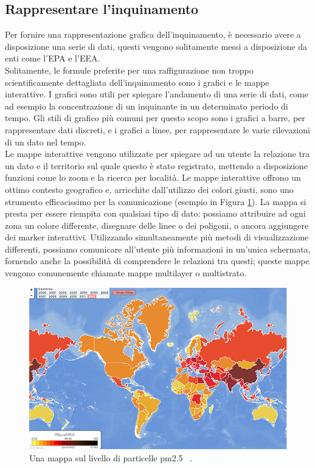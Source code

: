 \subsection{Rappresentare l'inquinamento}
Per fornire una rappresentazione grafica dell’inquinamento, è necessario avere a disposizione una serie di dati, questi vengono solitamente messi a disposizione da enti come l'EPA e l'EEA.
\\ 
Solitamente, le formule preferite per una raffigurazione non troppo scientificamente dettagliata dell’inquinamento sono i grafici e le mappe interattive.
I grafici sono utili per spiegare l'andamento di una serie di dati, come ad esempio la concentrazione di un inquinante in un determinato periodo di tempo.
Gli stili di grafico più comuni per questo scopo sono i grafici a barre, per rappresentare dati discreti, e i grafici a linee, per rappresentare le varie rilevazioni di un dato nel tempo.
\\ 
Le mappe interattive vengono utilizzate per spiegare ad un utente la relazione tra un dato e il territorio sul quale questo è stato registrato, mettendo a disposizione funzioni come lo zoom e la ricerca per località.
Le mappe interattive offrono un ottimo contesto geografico e, arricchite dall'utilizzo dei colori giusti, sono uno strumento efficacissimo per la comunicazione (esempio in Figura \ref{fig:pollution_map}).
La mappa si presta per essere riempita con qualsiasi tipo di dato: possiamo attribuire ad ogni zona un colore differente, disegnare delle linee o dei poligoni, o ancora aggiungere dei marker interattivi.
Utilizzando simultaneamente più metodi di visualizzazione differenti, possiamo comunicare all'utente più informazioni in un'unica schermata, fornendo anche la possibilità di comprendere le relazioni tra questi; queste mappe vengono comunemente chiamate mappe multilayer o multistrato.
\begin{figure}[H]
  \includegraphics[width=\linewidth]{img/mappapm.png}
  \caption{Una mappa sul livello di particelle pm2.5 ~\cite{aqimap}.}
  \label{fig:pollution_map}
\end{figure}


